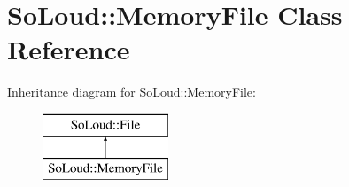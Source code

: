 \hypertarget{class_so_loud_1_1_memory_file}{}\section{So\+Loud\+:\+:Memory\+File Class Reference}
\label{class_so_loud_1_1_memory_file}
Inheritance diagram for So\+Loud\+:\+:Memory\+File\+:\begin{figure}[H]
\begin{center}
\leavevmode
\includegraphics[height=2.000000cm]{class_so_loud_1_1_memory_file}
\end{center}
\end{figure}
